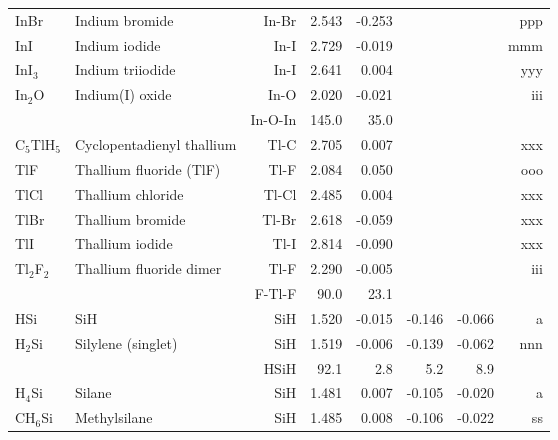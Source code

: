 \begin{table}
\begin{center}
\begin{tabular}{llrrrrrr}
 InBr        & Indium bromide                     &In-Br          &     2.543   &    -0.253 &  &  &   ppp \\
 InI         & Indium iodide                      &In-I           &     2.729   &    -0.019 &  &  &   mmm \\
 InI$_3$        & Indium triiodide                   &In-I           &     2.641   &     0.004 &  &  &   yyy \\
 In$_2$O        & Indium(I) oxide                    &In-O           &     2.020   &    -0.021 &  &  &   iii \\
             &                                    &In-O-In      &     145.0   &      35.0 &  &    &       \\
 C$_5$TlH$_5$      & Cyclopentadienyl thallium          &Tl-C           &     2.705   &     0.007 &  &  &   xxx \\
 TlF         & Thallium fluoride (TlF)            &Tl-F           &     2.084   &     0.050 &  &  &   ooo \\
 TlCl        & Thallium chloride                  &Tl-Cl          &     2.485   &     0.004 &  &  &   xxx \\
 TlBr        & Thallium bromide                   &Tl-Br          &     2.618   &    -0.059 &  &  &   xxx \\
 TlI         & Thallium iodide                    &Tl-I           &     2.814   &    -0.090 &  &  &   xxx \\
 Tl$_2$F$_2$       & Thallium fluoride dimer            &Tl-F           &     2.290   &    -0.005 &  &  &   iii \\
             &                                    &F-Tl-F       &      90.0   &      23.1 &  &    &       \\
 HSi         & SiH                                &SiH            &     1.520   &    -0.015 &    -0.146 &    -0.066 &     a \\
 H$_2$Si        & Silylene (singlet)                 &SiH            &     1.519   &    -0.006 &    -0.139 &    -0.062 &   nnn \\
             &                                    &HSiH         &      92.1   &       2.8 &       5.2 &       8.9   &       \\
 H$_4$Si        & Silane                             &SiH            &     1.481   &     0.007 &    -0.105 &    -0.020 &     a \\
 CH$_6$Si       & Methylsilane                       &SiH            &     1.485   &     0.008 &    -0.106 &    -0.022 &    ss \\

\end{tabular}
\end{center}
\end{table}
